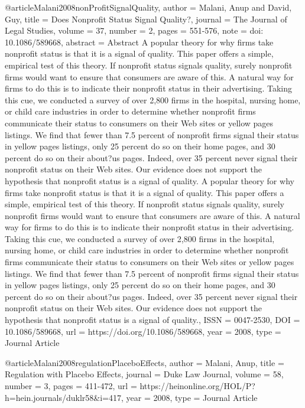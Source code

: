 @article{Malani2008nonProfitSignalQuality,
   author = {Malani, Anup and David, Guy},
   title = {Does Nonprofit Status Signal Quality?},
   journal = {The Journal of Legal Studies},
   volume = {37},
   number = {2},
   pages = {551-576},
   note = {doi: 10.1086/589668},
   abstract = {Abstract A popular theory for why firms take nonprofit status is that it is a signal of quality. This paper offers a simple, empirical test of this theory. If nonprofit status signals quality, surely nonprofit firms would want to ensure that consumers are aware of this. A natural way for firms to do this is to indicate their nonprofit status in their advertising. Taking this cue, we conducted a survey of over 2,800 firms in the hospital, nursing home, or child care industries in order to determine whether nonprofit firms communicate their status to consumers on their Web sites or yellow pages listings. We find that fewer than 7.5 percent of nonprofit firms signal their status in yellow pages listings, only 25 percent do so on their home pages, and 30 percent do so on their about?us pages. Indeed, over 35 percent never signal their nonprofit status on their Web sites. Our evidence does not support the hypothesis that nonprofit status is a signal of quality.
A popular theory for why firms take nonprofit status is that it is a signal of quality. This paper offers a simple, empirical test of this theory. If nonprofit status signals quality, surely nonprofit firms would want to ensure that consumers are aware of this. A natural way for firms to do this is to indicate their nonprofit status in their advertising. Taking this cue, we conducted a survey of over 2,800 firms in the hospital, nursing home, or child care industries in order to determine whether nonprofit firms communicate their status to consumers on their Web sites or yellow pages listings. We find that fewer than 7.5 percent of nonprofit firms signal their status in yellow pages listings, only 25 percent do so on their home pages, and 30 percent do so on their about?us pages. Indeed, over 35 percent never signal their nonprofit status on their Web sites. Our evidence does not support the hypothesis that nonprofit status is a signal of quality.},
   ISSN = {0047-2530},
   DOI = {10.1086/589668},
   url = {https://doi.org/10.1086/589668},
   year = {2008},
   type = {Journal Article}
}

@article{Malani2008regulationPlaceboEffects,
   author = {Malani, Anup},
   title = {Regulation with Placebo Effects},
   journal = {Duke Law Journal},
   volume = {58},
   number = {3},
   pages = {411-472},
   url = {https://heinonline.org/HOL/P?h=hein.journals/duklr58&i=417},
   year = {2008},
   type = {Journal Article}
}


